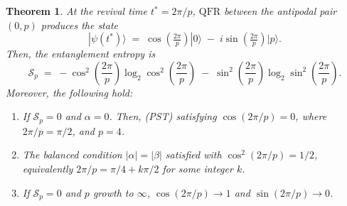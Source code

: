 \documentclass[12pt]{amsart}
\newtheorem{theorem}{Theorem}[section]
\newcommand{\QFR}{\mathrm{QFR}}
\begin{document}
\begin{theorem}\label{Thm5entropy}
At the revival time $t^* = 2\pi/p$, $\QFR$ between the antipodal pair
  $(0, p)$ produces the state
  \[
    |\psi(t^*)\rangle
    \;=\;
    \cos\!\left(\tfrac{2\pi}{p}\right)|0\rangle
    \;-\;
    i\sin\!\left(\tfrac{2\pi}{p}\right)|p\rangle.
  \]
Then, the entanglement entropy is
  \begin{equation}\label{eqq02entropy}
    \mathcal{S}_p
    \;=\;
    -\cos^2\!\!\left(\frac{2\pi}{p}\right)\log_2\!\cos^2\!\!\left(\frac{2\pi}{p}\right)
    \;-\;
    \sin^2\!\!\left(\frac{2\pi}{p}\right)\log_2\!\sin^2\!\!\left(\frac{2\pi}{p}\right).
  \end{equation}
  Moreover, the following hold:
  \begin{enumerate}
    \item If $\mathcal{S}_p = 0$ and $\alpha = 0$. Then,
    (PST) satisfying $\cos(2\pi/p) = 0$, where \ $2\pi/p=\pi/2$, and $p=4$.


    \item The balanced condition $|\alpha| = |\beta|$
    satisfied with $\cos^2(2\pi/p) = 1/2$, equivalently $2\pi/p = \pi/4 + k\pi/2$ for some
    integer $k$.

    \item If $\mathcal{S}_p=0$ and  $p$ growth to $\infty$,  $\cos(2\pi/p) \to 1$ and $\sin(2\pi/p) \to 0$.
  \end{enumerate}
\end{theorem}
\end{document}
